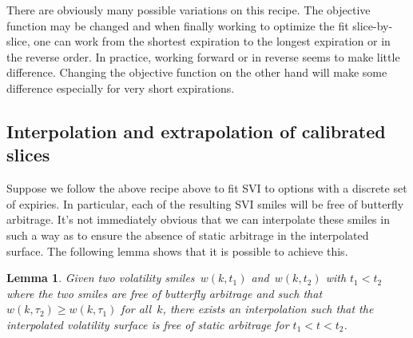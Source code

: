 \documentclass[12pt]{article}
\newtheorem{lemma}{Lemma}[section]
\numberwithin{equation}{section}
\begin{document}
There are obviously many possible variations on this recipe.  The objective function may be changed and when finally working to optimize the fit slice-by-slice, one can work from the shortest expiration to the longest expiration or in the reverse order.  In practice, working forward or in reverse seems to make little difference. Changing the objective function on the other hand will make some difference especially for very short expirations.

\subsection{Interpolation and extrapolation of calibrated slices}

{Suppose we follow the above recipe above to fit SVI to options with a discrete set of expiries.  In particular, each of the resulting SVI smiles will be free of butterfly arbitrage.  It's not immediately obvious that we can interpolate these smiles in such a way as to ensure the absence of static arbitrage in the interpolated surface.  The following lemma shows that it is possible to achieve this.}

\begin{lemma}\label{lem:interpolation}
Given two volatility smiles~$w(k,t_1)$ and~$w(k,t_2)$ with $t_1 < t_2$ where the two smiles are free of butterfly arbitrage and such that
$w(k,\tau_2)\geq w(k,\tau_1)$ for all~$k$, there exists an interpolation such that the interpolated volatility surface is free of static arbitrage for $t_1<t<t_2$.
\end{lemma}
\end{document}
